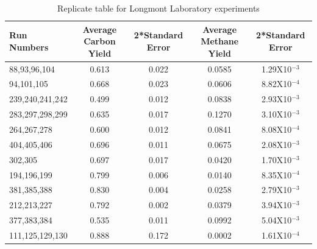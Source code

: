 \documentclass[11pt,twocolumn]{article}
\begin{document}
\begin{table}
\centering
\begin{tabular}{l c c c c}
Run Numbers &	Average Carbon Yield	&	2*Standard Error	&	Average Methane Yield	&	2*Standard Error	\\
\hline
88,93,96,104 &	0.613	& 0.022	&	0.0585	&	1.29X10$^{-3}$ \\
94,101,105	&	0.668	&	0.023	&	0.0606	&	8.82X10$^{-4}$ \\
239,240,241,242&	0.499	&	0.012	&	0.0838	&	2.93X10$^{-3}$ \\
283,297,298,299&	0.635	&	0.017	&	0.1270	&	3.10X10$^{-3}$ \\
264,267,278&		0.600	&	0.012	&	0.0841	&	8.08X10$^{-4}$ \\
404,405,406&		0.696	&	0.011	&	0.0675	& 	2.08X10$^{-3}$ \\
302,305&			0.697	&	0.017	&	0.0420	&	1.70X10$^{-3}$ \\
194,196,199&		0.799	&	0.006	&	0.0140	&	8.35X10$^{-4}$ \\
381,385,388&		0.830	&	0.004	&	0.0258	&	2.79X10$^{-3}$ \\
212,213,227&		0.792	&	0.002	&	0.0379	&	3.94X10$^{-3}$ \\
377,383,384&		0.535	&	0.011	&	0.0992	&	5.04X10$^{-3}$ \\
111,125,129,130&	0.888	&	0.172	&	0.0002	&	1.61X10$^{-4}$ \\
\end{tabular}
\caption{Replicate table for Longmont Laboratory experiments}
\label{tab-replication_analysis}

\end{table}
\end{document}
